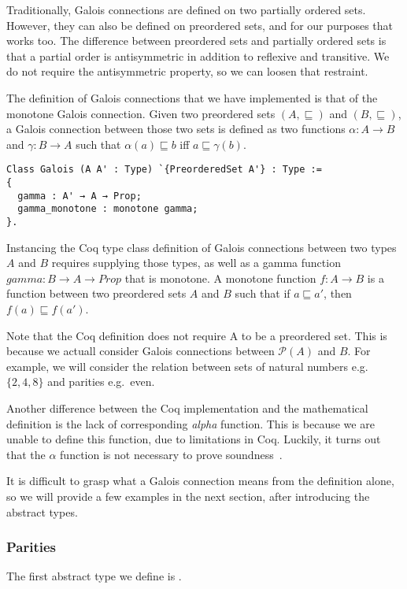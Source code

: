 Traditionally, Galois connections are defined on two partially ordered sets.
However, they can also be defined on preordered sets, and for our purposes that
works too. 
The difference between preordered sets and partially ordered sets is
that a partial order is antisymmetric in addition to reflexive and transitive.
We do not require the antisymmetric property, so we can loosen that restraint.

The definition of Galois connections that we have implemented is that of the
monotone Galois connection. Given two preordered sets $(A,\sqsubseteq)$ and
$(B,\sqsubseteq)$, a Galois connection between those two sets is defined as two
functions $\alpha : A \rightarrow B$ and $\gamma : B \rightarrow A$ such 
that $\alpha(a)
\sqsubseteq b$ iff $a \sqsubseteq \gamma(b)$.

\begin{verbatim}
Class Galois (A A' : Type) `{PreorderedSet A'} : Type :=
{
  gamma : A' → A → Prop;
  gamma_monotone : monotone gamma;
}.
\end{verbatim}

Instancing the Coq type class definition of Galois connections between two
types $A$ and $B$ requires supplying those types, as well as a gamma function
$gamma : B \rightarrow A \rightarrow Prop$ that is monotone. 
A monotone function $f : A \rightarrow B$ is
a function between two preordered sets $A$ and $B$ such that if $a \sqsubseteq
a'$, then $f(a) \sqsubseteq f(a')$.

Note that the Coq definition does not require A to be a preordered set. This is
because we actuall consider Galois connections between $\mathcal{P}(A)$ and
$B$. For example, we will consider the relation between sets of natural numbers
e.g.\ $\{2, 4, 8\}$ and parities e.g.\ even.

Another difference between the Coq implementation and the mathematical
definition is the lack of corresponding \textit{alpha} function. This is
because we are unable to define this function, due to limitations in Coq.
Luckily, it turns out that the $\alpha$ function is not necessary to prove
soundness~\cite{jourdan2016verasco}.

It is difficult to grasp what a Galois connection means from the definition
alone, so we will provide a few examples in the next section, after
introducing the abstract types.

\subsubsection{Parities}
The first abstract type we define is .


